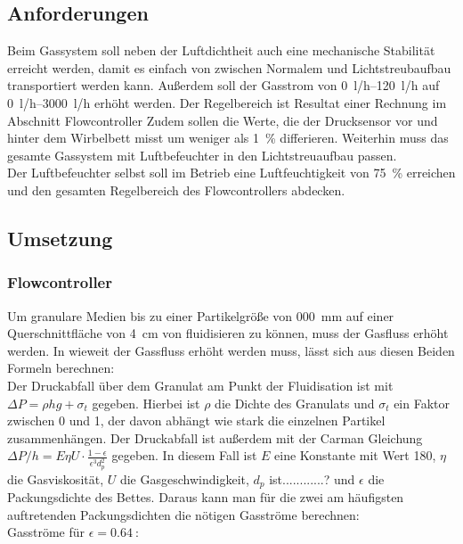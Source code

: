 \subsection{Anforderungen}

Beim Gassystem soll neben der Luftdichtheit auch eine mechanische Stabilität erreicht werden, damit es einfach von zwischen Normalem und Lichtstreubaufbau transportiert werden kann. Außerdem soll der Gasstrom von \SIrange{0}{120}{l/h} auf \SIrange{0}{3000}{l/h} erhöht werden. Der Regelbereich ist Resultat einer Rechnung im Abschnitt Flowcontroller Zudem sollen die Werte, die der Drucksensor vor und hinter dem Wirbelbett misst um weniger als \SI{1}{\%} differieren. Weiterhin muss das gesamte Gassystem mit Luftbefeuchter in den Lichtstreuaufbau passen. \\
Der Luftbefeuchter selbst soll im Betrieb eine Luftfeuchtigkeit von \SI{75}{\%} erreichen und den gesamten Regelbereich des Flowcontrollers abdecken.



\subsection{Umsetzung}

\subsubsection{Flowcontroller}

Um granulare Medien bis zu einer Partikelgröße von \SI{000}{mm} auf einer Querschnittfläche von \SI{4}{cm} von fluidisieren zu können, muss der Gasfluss erhöht werden. In wieweit der Gassfluss erhöht werden muss, lässt sich aus diesen Beiden Formeln berechnen: \\
Der Druckabfall über dem Granulat am Punkt der Fluidisation ist mit $\Delta P = \rho h g + \sigma_t$ gegeben. Hierbei ist $\rho$ die Dichte des Granulats und $\sigma_t$ ein Faktor zwischen 0 und 1, der davon abhängt wie stark die einzelnen Partikel zusammenhängen. Der Druckabfall ist außerdem mit der Carman Gleichung $\Delta P / h = E \eta U \cdot \frac{1 - \epsilon}{\epsilon^3 d_p^2}$ gegeben. In diesem Fall ist $E$ eine Konstante mit Wert 180, $\eta$ die Gasviskosität, $U$ die Gasgeschwindigkeit, $d_p$ ist............? und $\epsilon$ die Packungsdichte des Bettes. Daraus kann man für die zwei am häufigsten auftretenden Packungsdichten die nötigen Gasströme berechnen: \\

Gasströme für $\epsilon = \SI{0,64}{}$: \\

